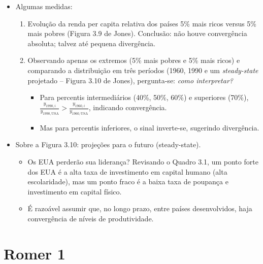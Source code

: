 \documentclass[a4paper,12pt]{article}[abntex2]
\begin{document}
\begin{itemize}
    \item Algumas medidas:
    \begin{enumerate}
        \item Evolução da renda per capita relativa dos países 5\% mais ricos 
              versus 5\% mais pobres (Figura 3.9 de Jones). 
              Conclusão: não houve convergência absoluta; 
              talvez até pequena divergência.
        \item Observando apenas os extremos (5\% mais pobres e 5\% mais ricos) 
              e comparando a distribuição em três períodos (1960, 1990 e 
              um \emph{steady-state} projetado -- Figura 3.10 de Jones), 
              pergunta-se: \emph{como interpretar?}
              \begin{itemize}
                  \item Para percentis intermediários (40\%, 50\%, 60\%) e superiores (70\%), 
                        \(\frac{y_{1990,i}}{y_{1990,\text{USA}}} 
                          > 
                          \frac{y_{1960,i}}{y_{1960,\text{USA}}}\), 
                        indicando convergência.
                  \item Mas para percentis inferiores, o sinal inverte-se, 
                        sugerindo divergência.
              \end{itemize}
    \end{enumerate}
    \item Sobre a Figura 3.10: projeções para o futuro (steady-state). 
    \begin{itemize}
        \item Os EUA perderão sua liderança? Revisando o Quadro 3.1, 
              um ponto forte dos EUA é a alta taxa de investimento em capital humano 
              (alta escolaridade), mas um ponto fraco é a baixa taxa de poupança 
              e investimento em capital físico.
        \item É razoável assumir que, no longo prazo, entre países desenvolvidos, 
              haja convergência de níveis de produtividade.
    \end{itemize}
\end{itemize}


\newpage
\section{\textbf{Romer 1}}
\end{document}
